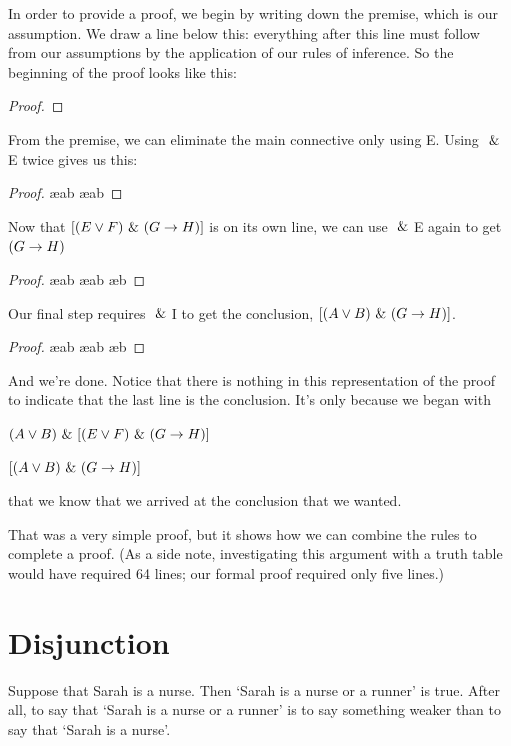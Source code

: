 In order to provide a proof, we begin by writing down the premise, which is our assumption. We draw a line below this: everything after this line must follow from our assumptions by the application of our rules of inference. So the beginning of the proof looks like this:
\begin{proof}
	 
\end{proof}
From the premise, we can eliminate the main connective only using {\eand}E. Using $~\&~$E twice gives us this:
\begin{proof}
	 
	 \ae{ab}
	 \ae{ab}
\end{proof}
Now that $[(E \vee F) ~\&~ (G\rightarrow H)]$ is on its own line, we can use $~\&~$E again to get $(G\rightarrow H)$ 
\begin{proof}
	 
	 \ae{ab}
	 \ae{ab}
	 \ae{b}
\end{proof}
Our final step requires $~\&~$I to get the conclusion, $[(A\vee B)~\&~(G\rightarrow H)]$.
\begin{proof}
	 
	 \ae{ab}
	 \ae{ab}
	 \ae{b}
	 
\end{proof}
And we're done. Notice that there is nothing in this representation of the proof to indicate that the last line is the conclusion. It's only because we began with
\begin{earg}
\item[] $(A\vee B) ~\&~ [(E \vee F) ~\&~ (G\rightarrow H)]$
\item[\therefore] $[(A\vee B)~\&~(G\rightarrow H)]$
\end{earg}
that we know that we arrived at the conclusion that we wanted.
 
That was a very simple proof, but it shows how we can combine the rules to complete a proof. (As a side note, investigating this argument with a truth table would have required 64 lines; our formal proof required only five lines.) 


\section{Disjunction}\label{s:disj-rule}
Suppose that Sarah is a nurse. Then `Sarah is a nurse or a runner' is true. After all, to say that `Sarah is a nurse or a runner' is to say something weaker than to say that `Sarah is a nurse'. 

